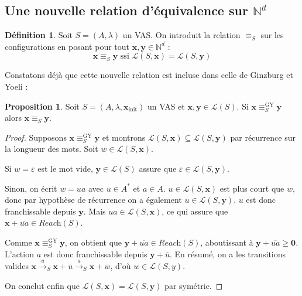 \documentclass[a4paper,final]{article}
\theoremstyle{definition}
\newtheorem{Definition}[Theorem]{Définition}
\newtheorem{Proposition}[Theorem]{Proposition}
\let\epsilon\varepsilon
\let\geq\geqslant
\newcommand{\N}{\ensuremath{\mathbb{N}}}
\newcommand{\lang}{\ensuremath{\mathcal{L}}}
\newcommand{\reach}{\ensuremath{\textit{Reach}}}
\newcommand{\trans}[2]{\ensuremath{\stackrel{#1}{\longrightarrow}_{#2}}}
\newcommand{\vect}[1]{\ensuremath{\mathbf{#1}}}
\newcommand{\rel}{\ensuremath{\equiv}}
\newcommand{\relGY}{\ensuremath{\equiv^\text{GY}_S}}
\newcommand{\ssi}{\ensuremath{\text{ ssi }}}
\newcommand{\xinit}{\ensuremath{\vect{x}_\text{init}}}
\newcommand{\valeur}[1]{\ensuremath{\overline{#1}}}
\begin{document}
\subsection{Une nouvelle relation d'équivalence sur $\N^d$}

\begin{Definition}
Soit $S=(A,\lambda)$ un VAS. On introduit la relation $\rel_S$ sur les configurations en posant pour tout $\vect{x},\vect{y} \in\N^d$ :
$$\vect{x} \rel_S \vect{y} \ssi \lang(S,\vect{x}) = \lang(S,\vect{y})$$
\end{Definition}


Constatons déjà que cette nouvelle relation est incluse dans celle de Ginzburg et Yoeli :

\begin{Proposition}
Soit $S=(A,\lambda,\xinit)$ un VAS et $\vect{x},\vect{y} \in\lang(S)$.
Si $\vect{x} \relGY \vect{y}$ alors $\vect{x} \rel_S \vect{y}$.
\end{Proposition}

\begin{proof}
Supposons $\vect{x} \relGY \vect{y}$ et montrons $\lang(S,\vect{x}) \subseteq \lang(S,\vect{y})$ par récurrence sur la longueur des mots.
Soit $w\in\lang(S,\vect{x})$.

Si $w=\epsilon$ est le mot vide, $\vect{y} \in\lang(S)$ assure que $\epsilon\in\lang(S,\vect{y})$.

Sinon, on écrit $w=ua$ avec $u\in A^\ast$ et $a\in A$.
$u\in\lang(S,\vect{x})$ est plus court que $w$, donc par hypothèse de récurrence on a également $u\in\lang(S,\vect{y})$.
$u$ est donc franchissable depuis $\vect{y}$.
Mais $ua\in\lang(S,\vect{x})$, ce qui assure que $\vect{x} +\valeur{ua}\in\reach(S)$.

Comme $\vect{x} \relGY \vect{y}$, on obtient que $\vect{y} +\valeur{ua} \in\reach(S)$, aboutissant à $\vect{y} +\valeur{ua} \geq\vect{0}$.
L'action $a$ est donc franchissable depuis $\vect{y} +\valeur{u}$.
En résumé, on a les transitions valides $\vect{x} \trans{u}{S} \vect{x} +\valeur{u} \trans{a}{S} \vect{x} +\valeur{w}$, d'où $w\in\lang(S,y)$.

On conclut enfin que $\lang(S,\vect{x}) = \lang(S,\vect{y})$ par symétrie.
\end{proof}
\end{document}
